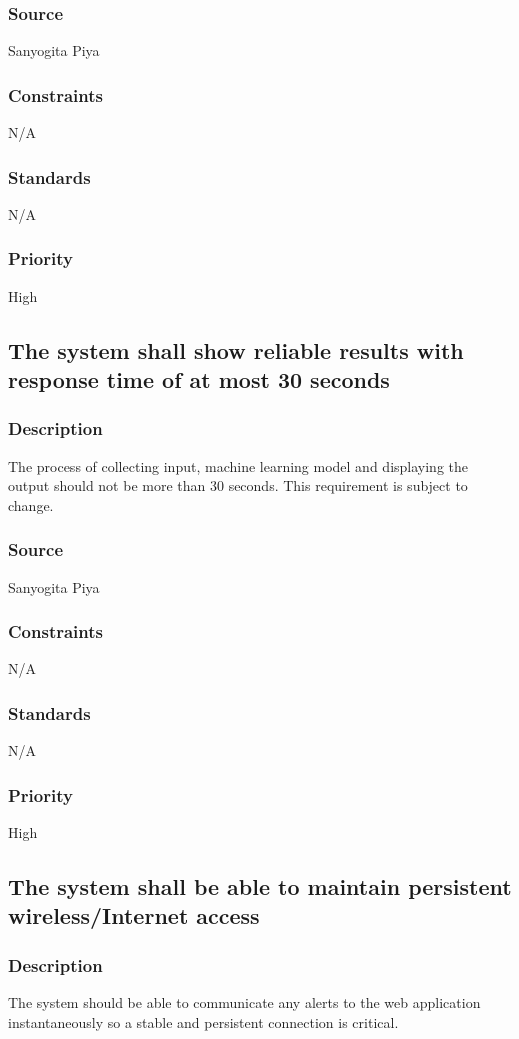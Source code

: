 \subsubsection{Source}
Sanyogita Piya
\subsubsection{Constraints}
N/A
\subsubsection{Standards}
N/A
\subsubsection{Priority}
High


\subsection{The system shall show reliable results with response time of at most 30 seconds}

\subsubsection{Description}
The process of collecting input, machine learning model and displaying the output should not be more than 30 seconds. This requirement is subject to change.
\subsubsection{Source}
Sanyogita Piya
\subsubsection{Constraints}
N/A
\subsubsection{Standards}
N/A
\subsubsection{Priority}
High

\subsection{The system shall be able to maintain persistent wireless/Internet access}
\subsubsection{Description}
The system should be able to communicate any alerts to the web application instantaneously so a stable and persistent connection is critical.
